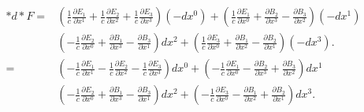 \begin{align*}
	\ast d \ast F = 
	&\left( \frac{1}{c}\frac{\partial E_1}{\partial x^1} + \frac{1}{c}\frac{\partial E_2}{\partial x^2} + \frac{1}{c}\frac{\partial E_3}{\partial x^3} \right) (-dx^0) +
	\left(\frac{1}{c}\frac{\partial E_1}{\partial x^0} + \frac{\partial B_2}{\partial x^3} - \frac{\partial B_3}{\partial x^2} \right) (-dx^1)\\
	&\left( -\frac{1}{c}\frac{\partial E_2}{\partial x^0} + \frac{\partial B_1}{\partial x^3} - \frac{\partial B_3}{\partial x^1} \right) dx^2 +
	\left( \frac{1}{c}\frac{\partial E_3}{\partial x^0} + \frac{\partial B_1}{\partial x^2} - \frac{\partial B_2}{\partial x^1} \right) (-dx^3).\\
	=
	&\left( -\frac{1}{c}\frac{\partial E_1}{\partial x^1} -\frac{1}{c}\frac{\partial E_2}{\partial x^2} - \frac{1}{c}\frac{\partial E_3}{\partial x^3} \right) dx^0 +
	\left(-\frac{1}{c}\frac{\partial E_1}{\partial x^0} - \frac{\partial B_2}{\partial x^3} + \frac{\partial B_3}{\partial x^2} \right) dx^1\\
	&\left( -\frac{1}{c}\frac{\partial E_2}{\partial x^0} + \frac{\partial B_1}{\partial x^3} - \frac{\partial B_3}{\partial x^1} \right) dx^2 +
	\left( -\frac{1}{c}\frac{\partial E_3}{\partial x^0} - \frac{\partial B_1}{\partial x^2} + \frac{\partial B_2}{\partial x^1} \right) dx^3.
\end{align*}
